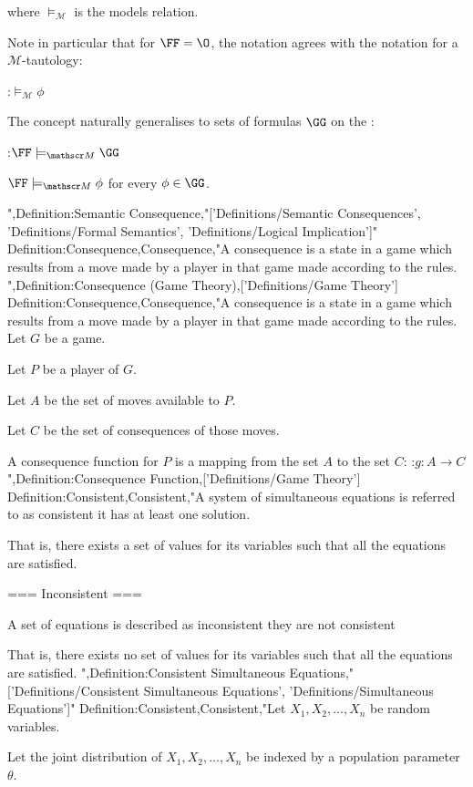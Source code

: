where $\models_{\mathscr M}$ is the models relation.


Note in particular that for $\FF = \O$, the notation agrees with the notation for a $\mathscr M$-tautology:

:$\models_{\mathscr M} \phi$


The concept naturally generalises to sets of formulas $\GG$ on the :

:$\FF \models_{\mathscr M} \GG$

 $\FF \models_{\mathscr M} \phi$ for every $\phi \in \GG$.





",Definition:Semantic Consequence,"['Definitions/Semantic Consequences', 'Definitions/Formal Semantics', 'Definitions/Logical Implication']"
Definition:Consequence,Consequence,"A consequence is a state in a game which results from a move made by a player in that game made according to the rules.
",Definition:Consequence (Game Theory),['Definitions/Game Theory']
Definition:Consequence,Consequence,"A consequence is a state in a game which results from a move made by a player in that game made according to the rules.
Let $G$ be a game.

Let $P$ be a player of $G$.

Let $A$ be the set of moves available to $P$.

Let $C$ be the set of consequences of those moves.


A consequence function for $P$ is a mapping from the set $A$ to the set $C$:
:$g: A \to C$
",Definition:Consequence Function,['Definitions/Game Theory']
Definition:Consistent,Consistent,"A system of simultaneous equations is referred to as consistent  it has at least one solution.

That is,  there exists a set of values for its variables such that all the equations are satisfied.


=== Inconsistent ===

A set of equations is described as inconsistent  they are not consistent

That is, there exists no set of values for its variables such that all the equations are satisfied.
",Definition:Consistent Simultaneous Equations,"['Definitions/Consistent Simultaneous Equations', 'Definitions/Simultaneous Equations']"
Definition:Consistent,Consistent,"Let $X_1, X_2, \ldots, X_n$ be random variables.

Let the joint distribution of $X_1, X_2, \ldots, X_n$ be indexed by a population parameter $\theta$.

